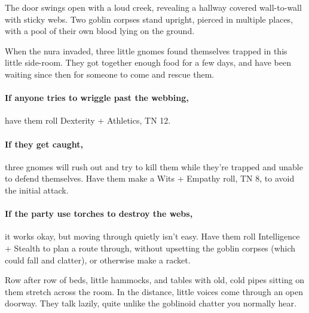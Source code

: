 \begin{multicols}{2}

\begin{boxtext}

	The door swings open with a loud creek, revealing a hallway covered wall-to-wall with sticky webs.
	Two goblin corpses stand upright, pierced in multiple places, with a pool of their own blood lying on the ground.

\end{boxtext}

\begin{exampletext}

	When the nura invaded, three little gnomes found themselves trapped in this little side-room.
	They got together enough food for a few days, and have been waiting since then for someone to come and rescue them.

\end{exampletext}

\paragraph{If anyone tries to wriggle past the webbing,}
have them roll Dexterity + Athletics, TN 12.

\paragraph{If they get caught,}
three gnomes will rush out and try to kill them while they're trapped and unable to defend themselves.
Have them make a Wits + Empathy roll, TN 8, to avoid the initial attack.

\paragraph{If the party use torches to destroy the webs,}
it works okay, but moving through quietly isn't easy.
Have them roll Intelligence + Stealth to plan a route through, without upsetting the goblin corpses (which could fall and clatter), or otherwise make a racket.

\label{lounge}

\begin{boxtext}

	Row after row of beds, little hammocks, and tables with old, cold pipes sitting on them stretch across the room.
	In the distance, little voices come through an open doorway.
	They talk lazily, quite unlike the goblinoid chatter you normally hear.


\end{boxtext}
\end{multicols}
